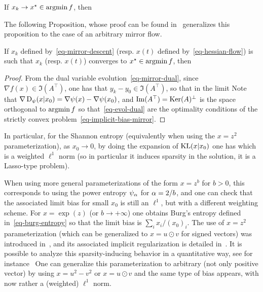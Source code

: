 \begin{prop}\label{prop-implicit-bias-l2}
	If $x_k \rightarrow x^\star \in \operatorname{argmin} f$, then
\end{prop}

The following Proposition, whose proof can be found in~\cite{gunasekar2018characterizing} generalizes this proposition to the case of an arbitrary mirror flow. 

\begin{prop}\label{prop-implicit-bias-mirror}
	If $x_k$ defined by~\eqref{eq-mirror-descent} (resp. $x(t)$ defined by~\eqref{eq-hessian-flow}) is such that $x_k$ (resp. $x(t)$) converges to $x^\star \in \operatorname{argmin} f$, then
\end{prop}
\begin{proof} 
	From the dual variable evolution~\eqref{eq-mirror-dual}, since $\nabla f(x) \in \Im(A^\top)$, one has that $y_k-y_0 \in \Im(A^\top)$, so that in the limit 
	Note that $\nabla\operatorname{D}_\psi(x|x_0) =\nabla\psi(x) - \nabla\psi(x_0)$, and $\operatorname{Im}(A^\top) = \operatorname{Ker}(A)^\bot$ is the space orthogonal to $\operatorname{argmin} f$ so that~\eqref{eq-evol-dual} are the optimality conditions of the strictly convex problem~\eqref{eq-implicit-bias-mirror}.
\end{proof}

In particular, for the Shannon entropy (equivalently when using the $x=z^2$ parameterization), as $x_0 \rightarrow 0$, by doing the expansion of $\operatorname{KL}(x|x_0)$ one has 
which is a weighted $\ell^1$ norm (so in particular it induces sparsity in the solution, it is a Lasso-type problem).

When using more general parameterizations of the form $x=z^b$ for $b>0$, this corresponds to using the power entropy $\psi_\alpha$ for $\alpha = 2/b$, and one can check that the associated limit bias for small $x_0$ is still an $\ell^1$, but with a different weighting scheme. For $x=\exp(z)$ (or $b \rightarrow +\infty$) one obtains Burg's entropy defined in~\eqref{eq-burg-entropy} so that the limit bias is  $\sum_i x_i/(x_0)_i$. 
%
The use of $x=z^2$ parameterization (which can be generalized to $x=u \odot v$ for signed vectors) was introduced in~\cite{hoff2017lasso}, and its associated implicit regularization is detailed in~\cite{vavskevivcius2019implicit,zhao2019implicit}. 
%
It is possible to analyze this sparsity-inducing behavior in a quantitative way, see for instance~\cite[Thm.2]{woodworth2020kernel}
%
One can generalize this parameterization to arbitrary (not only positive vector) by using $x=u^2-v^2$ or $x=u \odot v$ and the same type of bias appears, with now rather a (weighted) $\ell^1$ norm.
